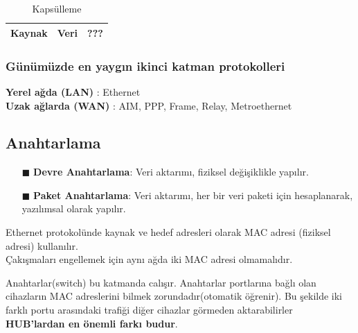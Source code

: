 \begin{table}[h]
	\centering
	\caption{Kapsülleme}
	\label{tab:table_kapsulleme}
	\begin{tabular}{|c|c|c|}
		\hline
		Kaynak & Veri & ??? \\
		\hline
	\end{tabular}
\end{table}

\subsubsection*{Günümüzde en yaygın ikinci katman protokolleri}
\textbf{Yerel ağda (LAN)} : Ethernet \\
\textbf{Uzak ağlarda (WAN)} : AIM, PPP, Frame, Relay, Metroethernet
\subsection*{Anahtarlama}
\begin{enumerate}
	\item[$\blacksquare$] \textbf{Devre Anahtarlama}: Veri aktarımı, fiziksel değişiklikle yapılır.
	\item[$\blacksquare$] \textbf{Paket Anahtarlama}: Veri aktarımı, her bir veri paketi için hesaplanarak, yazılımsal olarak yapılır.
\end{enumerate}
Ethernet protokolünde kaynak ve hedef adresleri olarak MAC adresi (fiziksel adresi) kullanılır.\\
Çakışmaları engellemek için aynı ağda iki MAC adresi olmamalıdır.

Anahtarlar(switch) bu katmanda calışır.
Anahtarlar portlarına bağlı olan cihazların MAC adreslerini bilmek zorundadır(otomatik öğrenir).
Bu şekilde iki farklı portu arasındaki trafiği diğer cihazlar görmeden aktarabilirler \textbf{HUB'lardan en önemli farkı budur}.

